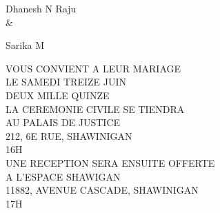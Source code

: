 \documentclass{letter}
\begin{document}
{\centering \carolyna\fontsize{36}{38}\selectfont Dhanesh N Raju\\\&\\ \begin{center} Sarika M \end{center} }
{\imfell \centering \normalsize \uppercase{Vous convient a leur mariage\\
\vspace{10mm}
le samedi treize juin\\
deux mille quinze\\
\vspace{10mm}
{\large la ceremonie civile se tiendra}\\
au Palais de Justice \\
212, 6e Rue, Shawinigan \\
16h\\
\vspace{10mm}
\large Une reception sera ensuite offerte\\
\normalsize a L'Espace Shawigan\\
11882, avenue Cascade, Shawinigan \\
17h\\

}}


\end{document}
